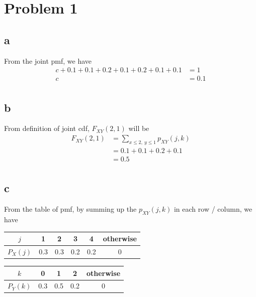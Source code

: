 \documentclass[12pt,letterpaper]{article}
\begin{document}
\section*{Problem 1}
    \subsection*{a}
        From the joint pmf, we have
        \begin{equation*}
            \begin{aligned}
                c + 0.1 + 0.1 + 0.2 + 0.1 + 0.2 + 0.1 + 0.1 &= 1 \\
                c &= 0.1 \\
            \end{aligned}
        \end{equation*}
    \subsection*{b}
        From definition of joint cdf, $F_{XY}(2, 1)$ will be
        \begin{equation*}
            \begin{aligned}
                F_{XY}(2, 1) &=  \sum_{x \leq 2,\ y \leq 1} p_{XY}(j, k) \\
                &= 0.1 + 0.1 + 0.2 + 0.1 \\
                &= 0.5 \\
            \end{aligned}
        \end{equation*}
    \subsection*{c}
        From the table of pmf, by summing up the $p_{XY}(j, k)$ in each row / column, we have
        \begin{center}
            \begin{tabular}{| c | c | c | c | c | c |}
                \hline
                $j$  & 1 & 2 & 3 & 4 & otherwise\\
                \hline
                $P_{X}(j)$ & 0.3 & 0.3 & 0.2 & 0.2 & 0 \\
                \hline
            \end{tabular}
        \end{center}
        \begin{center}
            \begin{tabular}{| c | c | c | c | c |}
                \hline
                $k$  & 0 & 1 & 2 & otherwise\\
                \hline
                $P_{Y}(k)$ & 0.3 & 0.5 & 0.2 & 0 \\
                \hline
            \end{tabular}
        \end{center}
\end{document}
